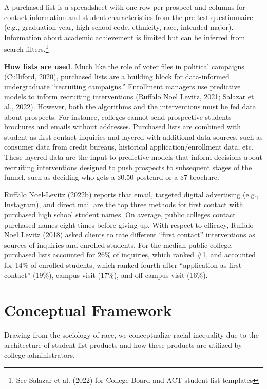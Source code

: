 \documentclass[
  12pt,
]{article}
\begin{document}
A purchased list is a spreadsheet with one row per prospect and columns for contact information and student characteristics from the pre-test questionnaire (e.g., graduation year, high school code, ethnicity, race, intended major). Information about academic achievement is limited but can be inferred from search filters.\footnote{See Salazar et al. (2022) for College Board and ACT student list templates}

\textbf{How lists are used}. Much like the role of voter files in political campaigns (Culliford, 2020), purchased lists are a building block for data-informed undergraduate ``recruiting campaigns.'' Enrollment managers use predictive models to inform recruiting interventions (Ruffalo Noel Levitz, 2021; Salazar et al., 2022). However, both the algorithms and the interventions must be fed data about prospects. For instance, colleges cannot send prospective students brochures and emails without addresses. Purchased lists are combined with student-as-first-contact inquiries and layered with additional data sources, such as consumer data from credit bureaus, historical application/enrollment data, etc. These layered data are the input to predictive models that inform decisions about recruiting interventions designed to push prospects to subsequent stages of the funnel, such as deciding who gets a \$0.50 postcard or a \$7 brochure.

Ruffalo Noel-Levitz (2022b) reports that email, targeted digital advertising (e.g., Instagram), and direct mail are the top three methods for first contact with purchased high school student names. On average, public colleges contact purchased names eight times before giving up. With respect to efficacy, Ruffalo Noel Levitz (2018) asked clients to rate different ``first contact'' interventions as sources of inquiries and enrolled students. For the median public college, purchased lists accounted for 26\% of inquiries, which ranked \#1, and accounted for 14\% of enrolled students, which ranked fourth after ``application as first contact'' (19\%), campus visit (17\%), and off-campus visit (16\%).

\hypertarget{conceptual-framework}{%
\section{Conceptual Framework}\label{conceptual-framework}}

Drawing from the sociology of race, we conceptualize racial inequality due to the architecture of student list products and how these products are utilized by college administrators.
\end{document}
